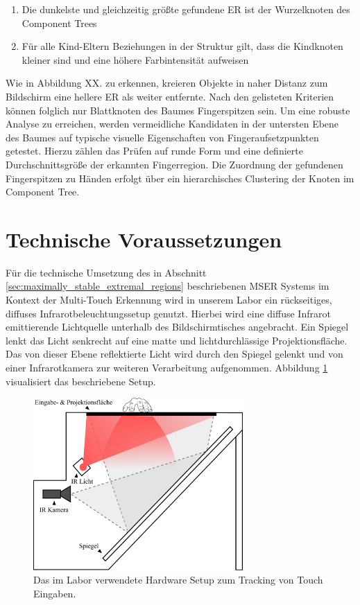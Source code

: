 \begin{enumerate}
\item Die dunkelste und gleichzeitig größte gefundene ER ist der Wurzelknoten des Component Trees
\item Für alle Kind-Eltern Beziehungen in der Struktur gilt, dass die Kindknoten kleiner sind und eine höhere Farbintensität aufweisen
\end{enumerate}

Wie in Abbildung XX. zu erkennen, kreieren Objekte in naher Distanz zum Bildschirm eine hellere ER als weiter entfernte. Nach den gelisteten Kriterien können folglich nur Blattknoten des Baumes Fingerspitzen sein. Um eine robuste Analyse zu erreichen, werden vermeidliche Kandidaten in der untersten Ebene des Baumes auf typische visuelle Eigenschaften von Fingeraufsetzpunkten getestet. Hierzu zählen das Prüfen auf runde Form und eine definierte Durchschnittsgröße der erkannten Fingerregion. Die Zuordnung der gefundenen Fingerspitzen zu Händen erfolgt über ein hierarchisches Clustering der Knoten im Component Tree.

\section{Technische Voraussetzungen}
\label{sec:technische_voraussetzungen}

Für die technische Umsetzung des in Abschnitt \ref{sec:maximally_stable_extremal_regions} beschriebenen MSER Systems im Kontext der Multi-Touch Erkennung wird in unserem Labor ein rückseitiges, diffuses Infrarotbeleuchtungssetup genutzt. Hierbei wird eine diffuse Infrarot emittierende Lichtquelle unterhalb des Bildschirmtisches angebracht. Ein Spiegel lenkt das Licht senkrecht auf eine matte und lichtdurchlässige Projektionsfläche. Das von dieser Ebene reflektierte Licht wird durch den Spiegel gelenkt und von einer Infrarotkamera zur weiteren Verarbeitung aufgenommen. Abbildung \ref{fig:table_setup} visualisiert das beschriebene Setup.

\begin{figure}
	\begin{center}
		\includegraphics[width=8cm]{img/table_setup.pdf}
	\end{center}
	\caption{Das im Labor verwendete Hardware Setup zum Tracking von Touch Eingaben.}
	\label{fig:table_setup}
\end{figure}


